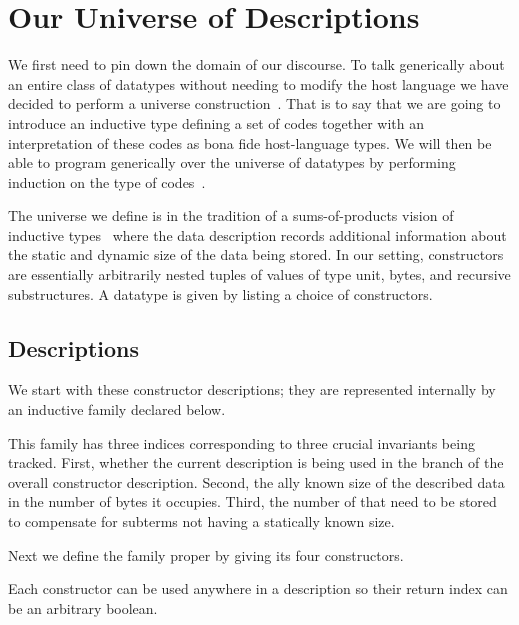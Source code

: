 \section{Our Universe of Descriptions}\label{sec:desc}

We first need to pin down the domain of our discourse.
%
To talk generically about an entire class of datatypes
without needing to modify the host language
we have decided to perform a universe
construction~\cite{benke-ugpp, DBLP:phd/ethos/Morris07, DBLP:conf/icfp/LohM11}.
%
That is to say that we are going to introduce an inductive type
defining a set of codes together
with an interpretation of these codes as bona fide
host-language types.
%
We will then be able to program generically over the universe of
datatypes by performing induction on the type of
codes~\cite{DBLP:conf/tphol/PfeiferR99}.

The universe we define is in the tradition of
a sums-of-products vision of inductive types~\cite{DBLP:conf/popl/JanssonJ97}
where the data description records additional information about
the static and dynamic size of the data being stored.
%
In our setting, constructors are essentially arbitrarily nested tuples of
values of type unit,
bytes,
and recursive substructures.
%
A datatype is given by listing a choice of constructors.

\subsection{Descriptions}

We start with these constructor descriptions;
they are represented internally by an inductive family 
declared below.


This family has three indices corresponding to three crucial
invariants being tracked.
%
First, whether the current description is being used in the
 branch of the overall constructor description.
%
Second, the ally known size of the described data
in the number of bytes it occupies.
%
Third, the number of  that need to be stored to
compensate for subterms not having a statically known size.

Next we define the family proper by giving its four constructors.


Each constructor can be used anywhere in a description so their return
 index can be an arbitrary boolean.

